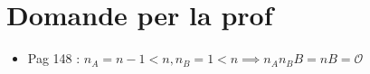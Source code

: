 \chapter{Domande per la prof}

\begin{itemize}
    \item {Pag 148 : $n_A = n - 1 < n, n_B = 1 < n \implies n_An_BB = nB = \mathcal{O}$}
\end{itemize}
